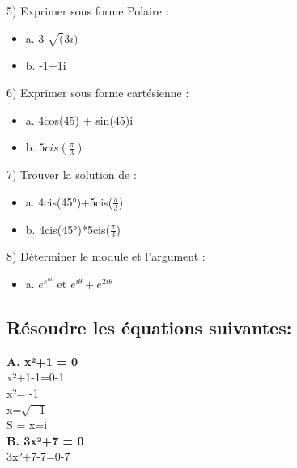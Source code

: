 \vspace{3mm} %
5) Exprimer sous forme Polaire :

\begin{itemize}
\item {a. 3-$\sqrt(3i)$}
\item {b. -1+1i}
\end{itemize}

\vspace{3mm} %
6) Exprimer sous forme cartésienne :

\begin{itemize}
\item {a. 4cos(45) + sin(45)i}
\item {b. $5cis(\frac{\pi}{3})$}
\end{itemize}

\vspace{3mm} %
7) Trouver la solution de :

\begin{itemize}
\item {a. 4cis(45°)+5cis($\frac{\pi}{3}$)}
\item {b. 4cis(45°)*5cis($\frac{\pi}{3}$)}
\end{itemize}

\vspace{3mm} %
8) Déterminer le module et l'argument :

\begin{itemize}
\item {a. $e^{e^{ia}}$  et $e^{i\theta} + e^{ 2 i \theta} $}
\end{itemize}

\newpage
\subsection{Résoudre les équations suivantes:}
\vspace{3mm} %

\textbf{A. x²+1 = 0} \\

x²+1-1=0-1 \\
x²= -1 \\
x=$\sqrt{-1}$ \\
S = x=i \\

\vspace{5mm} %
\textbf{B. 3x²+7 = 0} \\

3x²+7-7=0-7 \\

